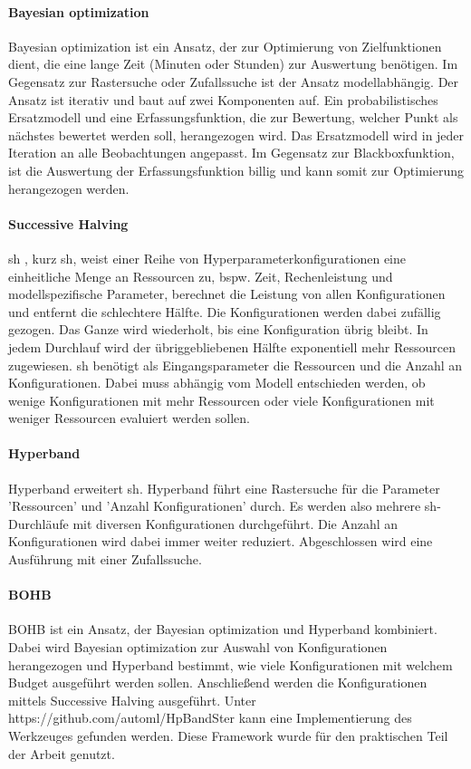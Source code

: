 	\paragraph{Bayesian optimization}
	Bayesian optimization ist ein Ansatz, der zur Optimierung von Zielfunktionen dient, die eine lange Zeit (Minuten oder Stunden) zur Auswertung benötigen. Im Gegensatz zur Rastersuche oder Zufallssuche ist der Ansatz modellabhängig. Der Ansatz ist iterativ und baut auf zwei Komponenten auf. Ein probabilistisches Ersatzmodell und eine Erfassungsfunktion, die zur Bewertung, welcher Punkt als nächstes bewertet werden soll, herangezogen wird. Das Ersatzmodell wird in jeder Iteration an alle Beobachtungen angepasst. Im Gegensatz zur Blackboxfunktion, ist die Auswertung der Erfassungsfunktion billig und kann somit zur Optimierung herangezogen werden.
	\cite{Frazier.201807}
	
	\paragraph{Successive Halving}
	\acl{sh} \cite{Jamieson.2015}, kurz \ac{sh}, weist einer Reihe von Hyperparameterkonfigurationen eine einheitliche Menge an Ressourcen zu, bspw. Zeit, Rechenleistung und modellspezifische Parameter, berechnet die Leistung von allen Konfigurationen und entfernt die schlechtere Hälfte. Die Konfigurationen werden dabei zufällig gezogen. Das Ganze wird wiederholt, bis eine Konfiguration übrig bleibt. In jedem Durchlauf wird der übriggebliebenen Hälfte exponentiell mehr Ressourcen zugewiesen. \ac{sh} benötigt als Eingangsparameter die Ressourcen und die Anzahl an Konfigurationen. Dabei muss abhängig vom Modell entschieden werden, ob wenige Konfigurationen mit mehr Ressourcen oder viele Konfigurationen mit weniger Ressourcen evaluiert werden sollen.
			
	\paragraph{Hyperband}	
	Hyperband \cite{Li.2017} erweitert \acl{sh}. Hyperband führt eine Rastersuche für die Parameter 'Ressourcen' und 'Anzahl Konfigurationen' durch. Es werden also mehrere \ac{sh}-Durchläufe mit diversen Konfigurationen durchgeführt. Die Anzahl an Konfigurationen wird dabei immer weiter reduziert. Abgeschlossen wird eine Ausführung mit einer Zufallssuche.
	
	\paragraph{BOHB}
	BOHB \cite{StefanFalkner.2018} ist ein Ansatz, der Bayesian optimization und Hyperband kombiniert. Dabei wird Bayesian optimization zur Auswahl von Konfigurationen herangezogen und Hyperband bestimmt, wie viele Konfigurationen mit welchem Budget ausgeführt werden sollen. Anschließend werden die Konfigurationen mittels Successive Halving ausgeführt. Unter https://github.com/automl/HpBandSter kann eine Implementierung des Werkzeuges gefunden werden. Diese Framework wurde für den praktischen Teil der Arbeit genutzt.
			
